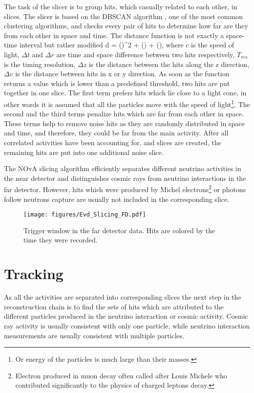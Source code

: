 The task of the slicer is to group hits, which casually related to each other, in slices. The slicer 
is based on the DBSCAN algorithm \cite{DBSCAN}, one of the most common clustering algorithms, and checks 
every pair of hits to determine how far are they from each other in space and time. The distance 
function is not exactly a space-time interval but rather modified 
\be
d = \Big(\Big)^2 + \Big(\Big) + 
\Big(\Big),
\ee 
where $c$ is the speed of light, $\Delta t$ and $\Delta r$ are time and space difference between two 
hits respectively, $T_{res}$ is the timing resolution, $\Delta z$ is the distance between the hits
along the z direction, $\Delta v$ is the distance between hits in x or y direction. As soon as the 
function returns a value which is lower than a predefined threshold, two hits are put together in one slice.
The first term prefers hits which lie close to a light cone, in other words it is assumed that all
the particles move with the speed of light\footnote{Or energy of the particles is much large than their 
masses.}. The second and the third terms penalize hits which are far from each other in space. These
terms help to remove noise hits as they are randomly distributed in space and time, and therefore, they 
could be far from the main activity. After all correlated activities have been accounting for, and 
slices are created, the remaining hits are put into one additional noise slice.

The NOvA slicing algorithm efficiently separates different neutrino activities in the near detector
and distinguishes cosmic rays from neutrino interactions in the far detector. However, hits which were produced
by Michel electrons\footnote{Electron produced in muon decay often called after Louis Michele who
contributed significantly to the physics of charged leptons decay.} or photons follow neutrons capture are
usually not included in the corresponding slice.
\begin{figure}[t]
\texttt{[image: figures/Evd\_Slicing\_FD.pdf]}
\centering
\caption{Trigger window in the far detector data. Hits are colored by the time they were recorded.} 
\label{fig:EVD_full}
\end{figure}

\section{Tracking}
As all the activities are separated into corresponding slices the next step in the reconstruction chain is 
to find the sets of hits which are attributed to the different particles produced in the neutrino interaction 
or cosmic activity. Cosmic ray activity is usually consistent with only one particle, while neutrino 
interaction measurements are usually consistent with multiple particles.

